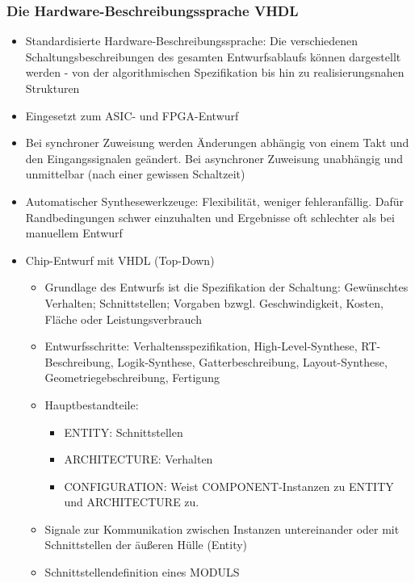 \subsubsection{Die Hardware-Beschreibungssprache VHDL}
\begin{itemize}
	\item Standardisierte Hardware-Beschreibungssprache: Die verschiedenen Schaltungsbeschreibungen des gesamten Entwurfsablaufs können dargestellt werden - von der algorithmischen Spezifikation bis hin zu realisierungsnahen Strukturen
	\item Eingesetzt zum ASIC- und FPGA-Entwurf
	\item Bei synchroner Zuweisung werden Änderungen abhängig von einem Takt und den Eingangssignalen geändert. Bei asynchroner Zuweisung unabhängig und unmittelbar (nach einer gewissen Schaltzeit)
	\item Automatischer Synthesewerkzeuge: Flexibilität, weniger fehleranfällig. Dafür Randbedingungen schwer einzuhalten und Ergebnisse oft schlechter als bei manuellem Entwurf
	\item Chip-Entwurf mit VHDL (Top-Down)
	\begin{itemize}
		\item Grundlage des Entwurfs ist die Spezifikation der Schaltung: Gewünschtes Verhalten; Schnittstellen; Vorgaben bzwgl. Geschwindigkeit, Kosten, Fläche oder Leistungsverbrauch
		\item Entwurfsschritte: Verhaltensspezifikation, High-Level-Synthese, RT-Beschreibung, Logik-Synthese, Gatterbeschreibung, Layout-Synthese, Geometriegebschreibung, Fertigung
		\item Hauptbestandteile: 
		\begin{itemize}
			\item ENTITY: Schnittstellen
			\item ARCHITECTURE: Verhalten
			\item CONFIGURATION: Weist COMPONENT-Instanzen zu ENTITY und ARCHITECTURE zu.
		\end{itemize} 
		\item Signale zur Kommunikation zwischen Instanzen untereinander oder mit Schnittstellen der äußeren Hülle (Entity)
		\item Schnittstellendefinition eines MODULS\\\\
			\begin{minipage}{\linewidth}
			\begin{lstlisting}[frame=single,numbers=left,mathescape,language=VHDL,tabsize=4]

\end{lstlisting}
\end{minipage}
\end{itemize}
\end{itemize}
